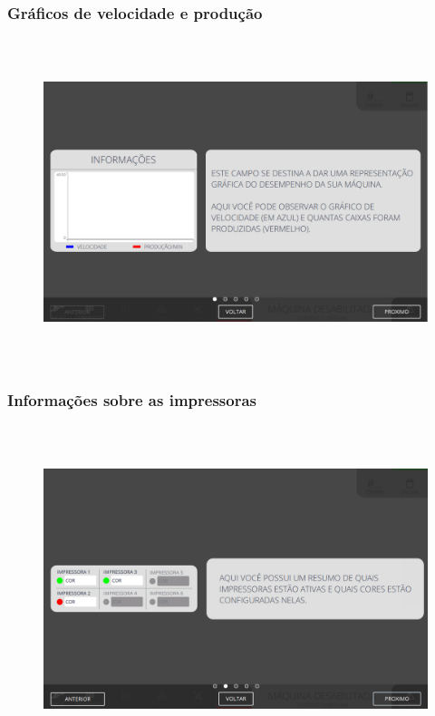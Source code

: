 \vspace*{\fill}

\subsubsection{\small{Gráficos de velocidade e produção}}


\begin{figure}[h]
  \centering
  \includegraphics[width=576px,height=360px]{src/imagesFlexo/01-main/e-1.png}
   \label{}
\end{figure}

\vspace*{\fill}

\newpage
\thispagestyle{fancy}

\vspace*{\fill}

\subsubsection{\small{Informações sobre as impressoras}}


\begin{figure}[h]
  \centering
  \includegraphics[width=576px,height=360px]{src/imagesFlexo/01-main/e-2.png}
   \label{}
\end{figure}

